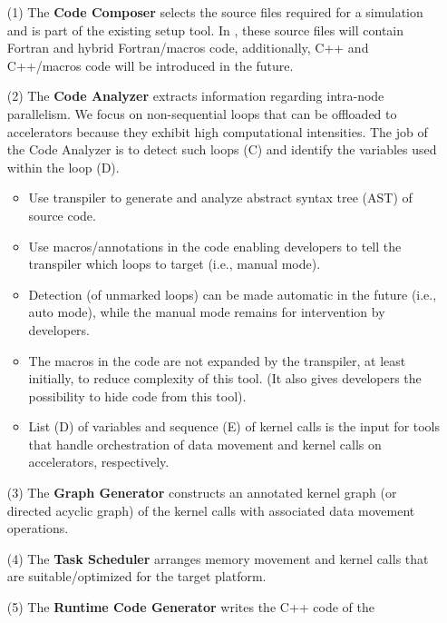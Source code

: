\documentclass{article}
\begin{document}
\begin{enumerate}
  \item[(1)] The \textbf{Code Composer} selects the source files required for
    a simulation and is part of the existing setup tool.
    In \FlashOfTheFuture, these source files will contain Fortran and hybrid
    Fortran/macros code, additionally, C++ and C++/macros code will be
    introduced in the future.
  \item[(2)] The \textbf{Code Analyzer} extracts information regarding
    intra-node parallelism.  We focus on non-sequential loops that
    can be offloaded to accelerators because they exhibit high computational
    intensities.  The job of the Code Analyzer is to detect such loops (C)
    and identify the variables used within the loop (D).
    \begin{itemize}
      \item Use transpiler to generate and analyze abstract syntax tree (AST)
        of source code.
      \item Use macros/annotations in the code enabling developers to
        tell the transpiler which loops to target (i.e., manual mode).
      \item Detection (of unmarked loops) can be made automatic in the future
        (i.e., auto mode), while the manual mode remains for intervention by
        developers.
      \item The macros in the code are not expanded by the transpiler, at least
        initially, to reduce complexity of this tool.  (It also gives
        developers the possibility to hide code from this tool).
      \item List (D) of variables and sequence (E) of kernel calls is the input
        for tools that handle orchestration of data movement and kernel calls
        on accelerators, respectively.
    \end{itemize}
  \item[(3)] The \textbf{Graph Generator} constructs an annotated kernel graph
    (or directed acyclic graph) of the kernel calls with associated data
    movement operations.
  \item[(4)] The \textbf{Task Scheduler} arranges memory movement and kernel
    calls that are suitable/optimized for the target platform.
  \item[(5)] The \textbf{Runtime Code Generator} writes the C++ code of the

\end{enumerate}
\end{document}
